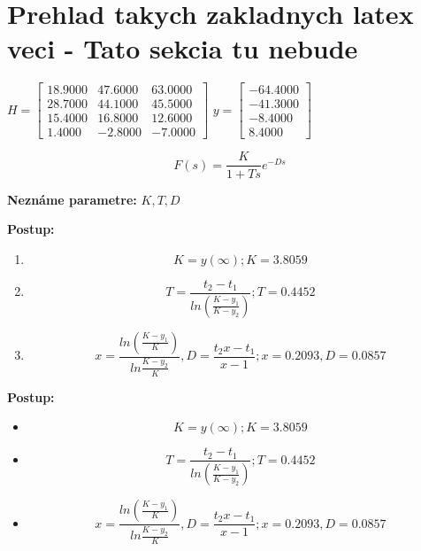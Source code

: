 \newpage
\section{Prehlad takych zakladnych latex veci - Tato sekcia tu nebude }\label{sec:prehlad}

$ H = \begin{bmatrix} 18.9000 & 47.6000 & 63.0000 \\ 28.7000 & 44.1000 & 45.5000 \\ 15.4000  & 16.8000  & 12.6000 \\ 1.4000 & -2.8000  & -7.0000 \end{bmatrix}$
$ y = \begin{bmatrix} -64.4000 \\ -41.3000 \\ -8.4000 \\ 8.4000 \end{bmatrix}$

\begin{equation}\label{eq:Rovnica}
F(s) = \frac{K}{1+Ts}e^{-Ds}
\end{equation}


\textbf{Neznáme parametre:} $K,T,D$


\textbf{Postup:}
\begin{enumerate}
\item \[K = y(\infty); K = 3.8059\]
\item \[T = \frac{t_2-t_1}{ln(\frac{K-y_1}{K-y_2})} ; T = 0.4452 \]
\item \[x = \frac{ln(\frac{K-y_1}{K})}{ln\frac{K-y_2}{K}}, D = \frac{t_2x-t_1}{x-1}; x = 0.2093, D = 0.0857\]
\end{enumerate}

\textbf{Postup:}
\begin{itemize}
\item \[K = y(\infty); K = 3.8059\]
\item \[T = \frac{t_2-t_1}{ln(\frac{K-y_1}{K-y_2})} ; T = 0.4452 \]
\item \[x = \frac{ln(\frac{K-y_1}{K})}{ln\frac{K-y_2}{K}}, D = \frac{t_2x-t_1}{x-1}; x = 0.2093, D = 0.0857\]
\end{itemize}

